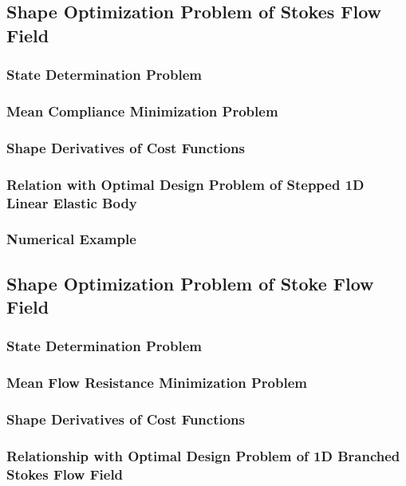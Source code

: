 \documentclass[oneside]{book}
\numberwithin{equation}{section}
\begin{document}
\subsection{Shape Optimization Problem of Stokes Flow Field}

\subsubsection{State Determination Problem}

\subsubsection{Mean Compliance Minimization Problem}

\subsubsection{Shape Derivatives of Cost Functions}

\subsubsection{Relation with Optimal Design Problem of Stepped 1D Linear Elastic Body}

\subsubsection{Numerical Example}

\subsection{Shape Optimization Problem of Stoke Flow Field}

\subsubsection{State Determination Problem}

\subsubsection{Mean Flow Resistance Minimization Problem}

\subsubsection{Shape Derivatives of Cost Functions}

\subsubsection{Relationship with Optimal Design Problem of 1D Branched Stokes Flow Field}
\end{document}

